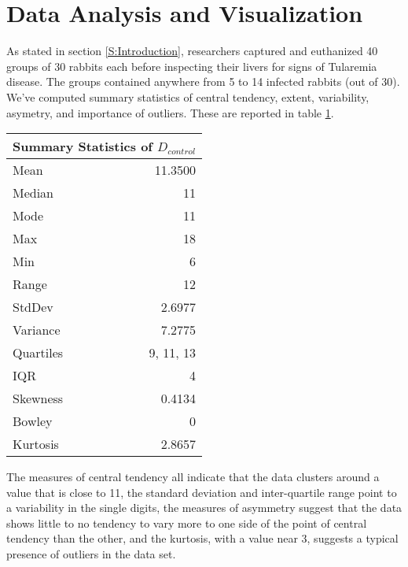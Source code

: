 \documentclass{amsart}
\begin{document}
\section{Data Analysis and Visualization}
As stated in section \ref{S:Introduction}, researchers captured and euthanized 40 groups of 30 rabbits each before inspecting their livers for signs of Tularemia disease. The groups contained anywhere from 5 to 14 infected rabbits (out of 30). We've computed summary statistics of central tendency, extent, variability, asymetry, and importance of outliers. These are reported in table \ref{Tbl:statistics}.
\begin{table}[h]\label{Tbl:statistics}
\begin{tabular}{lr}
\toprule
\multicolumn{2}{c}{\textbf{Summary Statistics of $D_{control}$}}\\
\midrule
Mean & 11.3500 \\
       Median& 11\\
         Mode& 11\\
          Max& 18\\
          Min& 6\\
        Range& 12\\
       StdDev& 2.6977\\
     Variance& 7.2775\\
    Quartiles& 9, 11, 13\\
          IQR& 4\\
     Skewness& 0.4134\\
       Bowley& 0\\
     Kurtosis& 2.8657\\
\bottomrule
\end{tabular}
\end{table}
The measures of central tendency all indicate that the data clusters around a value that is close to 11, the standard deviation and inter-quartile range point to a variability in the single digits, the measures of asymmetry suggest that the data shows little to no tendency to vary more to one side of the point of central tendency than the other, and the kurtosis, with a value near 3, suggests a typical presence of outliers in the data set.
\end{document}
